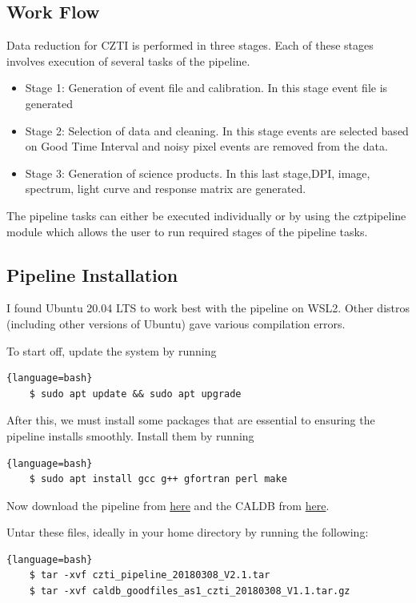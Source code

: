 \documentclass[11pt]{book} %
\begin{document}
\subsection{Work Flow}

Data reduction for CZTI is performed in three stages. Each of these stages involves
execution of several tasks of the pipeline.

\begin{itemize}
    \item Stage 1: Generation of event file and calibration. In this stage event file is generated
    \item Stage 2: Selection of data and cleaning. In this stage events are selected based on Good Time Interval and noisy pixel events are removed from the data.
    \item Stage 3: Generation of science products. In this last stage,DPI, image, spectrum, light curve and response matrix are generated.
\end{itemize}

The pipeline tasks can either be executed individually or by using the cztpipeline
module which allows the user to run required stages of the pipeline tasks.


\subsection{Pipeline Installation}

I found Ubuntu 20.04 LTS to work best with the pipeline on WSL2. Other distros (including other versions of Ubuntu) gave various compilation errors.

To start off, update the system by running 
\begin{lstlisting}{language=bash}
    $ sudo apt update && sudo apt upgrade
\end{lstlisting}

After this, we must install some packages that are essential to ensuring the pipeline installs smoothly. Install them by running 
\begin{lstlisting}{language=bash}
    $ sudo apt install gcc g++ gfortran perl make
\end{lstlisting}


Now download the pipeline from \href{http://astrosat-ssc.iucaa.in/uploads/czti/czti_pipeline_20180308_V2.1.tar}{here} and the CALDB from \href{http://astrosat-ssc.iucaa.in/uploads/czti/caldb_goodfiles_as1_czti_20180308_V1.1.tar.gz}{here}. 

Untar these files, ideally in your home directory by running the following:
\begin{lstlisting}{language=bash}
    $ tar -xvf czti_pipeline_20180308_V2.1.tar
    $ tar -xvf caldb_goodfiles_as1_czti_20180308_V1.1.tar.gz
\end{lstlisting}
\end{document}

